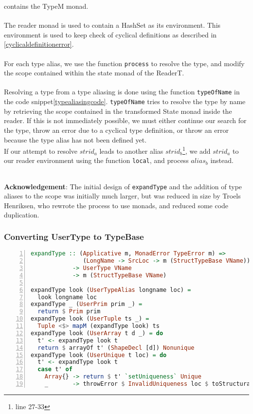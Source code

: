 contains the TypeM monad.
\\
\\
\noindent
The reader monad is used to contain a HashSet as its environment. This
environment is used to keep check of cyclical definitions as described in
\ref{cyclicaldefinitionerror}.
\\
\\
For each type alias, we use the function \texttt{process} to resolve the type, and modify
the scope contained within the state monad of the ReaderT.
\\
\\
Resolving a type from a type aliasing is done using the function \texttt{typeOfName} in
the code snippet\ref{typealiasingcode}. \texttt{typeOfName} tries to
resolve the type by name by retrieving the scope contained in the transformed
State monad inside the reader.
\clearpage
\noindent
If this is not immediately possible, we must either continue our search for the type, throw an error due to a cyclical type definition, or throw an error because the type alias has not been defined yet.
\\
If our attempt to resolve $strid_a$ leads to another alias
$strid_b$\footnote{line 27-33}, we add
$strid_a$ to our reader environment using the function \texttt{local}, and
process $alias_b$ instead.
\\
\\
\begin{tcolorbox}
\textbf{Acknowledgement}: The initial design of \texttt{expandType} and the addition of
type aliases to the scope was initially much larger, but was reduced in size by
Troels Henriksen, who rewrote the process to use monads, and reduced some code
duplication. 
\end{tcolorbox}
\subsubsection{Converting UserType to TypeBase}
\begin{lstlisting}[language=Haskell, numbers=left]
expandType :: (Applicative m, MonadError TypeError m) =>
               (LongName -> SrcLoc -> m (StructTypeBase VName))
            -> UserType VName
            -> m (StructTypeBase VName)

expandType look (UserTypeAlias longname loc) =
  look longname loc
expandType _ (UserPrim prim _) =
  return $ Prim prim
expandType look (UserTuple ts _) =
  Tuple <$> mapM (expandType look) ts
expandType look (UserArray t d _) = do
  t' <- expandType look t
  return $ arrayOf t' (ShapeDecl [d]) Nonunique
expandType look (UserUnique t loc) = do
  t' <- expandType look t
  case t' of
    Array{} -> return $ t' `setUniqueness` Unique
    _       -> throwError $ InvalidUniqueness loc $ toStructural t'

\end{lstlisting}

